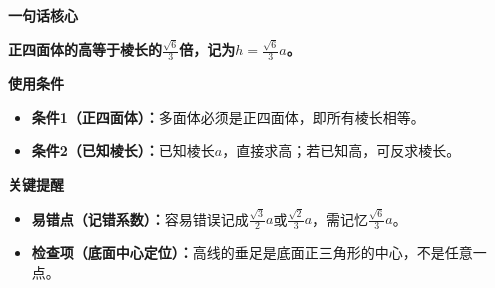 \begin{summarybox}
	\textbf{\textcolor{CSummary}{一句话核心}}

	\textbf{正四面体的高等于棱长的$\frac{\sqrt{6}}{3}$倍，记为$h = \frac{\sqrt{6}}{3}a$。}

	\medskip
	\textbf{\textcolor{CSummary}{使用条件}}
	\begin{itemize}[leftmargin=*, itemsep=0.5em, topsep=0.4em]
		\item \textbf{条件1（正四面体）：}多面体必须是正四面体，即所有棱长相等。
		\item \textbf{条件2（已知棱长）：}已知棱长$a$，直接求高；若已知高，可反求棱长。
	\end{itemize}

	\medskip
	\textbf{\textcolor{CSummary}{关键提醒}}
	\begin{itemize}[leftmargin=*, itemsep=0.5em, topsep=0.4em]
		\item \textbf{易错点（记错系数）：}容易错误记成$\frac{\sqrt{3}}{2}a$或$\frac{\sqrt{2}}{3}a$，需记忆$\frac{\sqrt{6}}{3}a$。
		\item \textbf{检查项（底面中心定位）：}高线的垂足是底面正三角形的中心，不是任意一点。
	\end{itemize}
\end{summarybox}
